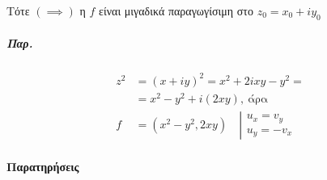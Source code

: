 \documentclass[12pt,a4paper,titlepage,fleqn]{article}
\begin{document}
    Τότε \( (\implies) \) η \( f \) είναι μιγαδικά παραγωγίσιμη στο \( z_0=x_0+iy_0 \)
    
    \subparagraph{Παρ.}
    \begin{align*}
    z^2 &= (x+iy)^2=x^2+2ixy-y^2 =
    \\  &= x^2-y^2+i(2xy),\ \text{άρα}\\
    f &= (x^2-y^2,2xy) \quad \left| \begin{array}{l}
    u_x=v_y\\ u_y = -v_x
    \end{array} \right.
    \end{align*}
    
    \paragraph{Παρατηρήσεις}
\end{document}
